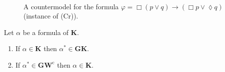 \documentclass[copyright,creativecommons]{eptcs}
\newcommand{\GKL}{\mathbf{GK}}
\newcommand{\GWCL}{\mathbf{GW}^\mathrm{c}}
\newcommand{\KL}{\mathbf{K}}
\newcommand{\Diam}{\lozenge}
\renewcommand{\a}{\alpha}
\begin{document}
\begin{figure}[t]
\[\begin{array}{c}
  \end{array}
  \]
  
  \caption{A countermodel for the formula $\varphi=\Box (p\lor q)\to
    (\Box p \lor \Diam q) $ (instance of (Cr)).}
  \label{fig:countGW}
\end{figure}



\begin{lemma}\label{lemma:K}
  Let $\a$ be a formula of  $\KL$. 

\begin{enumerate}[label=(\roman*), ref=(\roman*),leftmargin=*]    
\item\label{lemma:K:1}
If $\a\in\KL$ then $\a^*\in \GKL$.
  
\item\label{lemma:K:2}
If $\a^*\in \GWCL$ then  $\a\in\KL$. 
  
  \end{enumerate}
\end{lemma}
\end{document}
